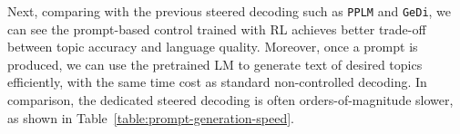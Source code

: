 Next, comparing with the previous steered decoding such as \texttt{PPLM} and \texttt{GeDi},
we can see the prompt-based control trained with RL achieves better trade-off between topic accuracy and language quality. Moreover, once a prompt is produced, we can use the pretrained LM to generate text of desired topics efficiently, with the same time cost as standard non-controlled decoding. In comparison, the dedicated steered decoding is often orders-of-magnitude slower, as shown in Table~\ref{table:prompt-generation-speed}.





